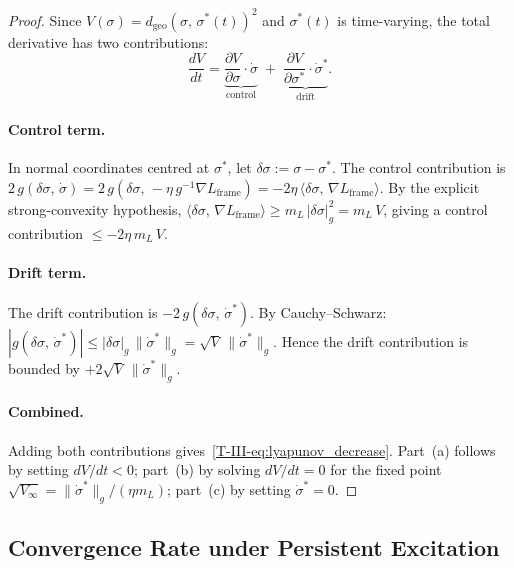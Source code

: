 \documentclass[12pt,a4paper,openany]{book}
\begin{document}
\begin{proof}
Since $V(\sigma) = d_{\mathrm{geo}}(\sigma,\,\sigma^*(t))^2$
and $\sigma^*(t)$ is time-varying, the total derivative
has two contributions:
\begin{equation*}
\frac{dV}{dt}
= \underbrace{\frac{\partial V}{\partial \sigma}
  \cdot \dot{\sigma}}_{\text{control}}
\;+\; \underbrace{\frac{\partial V}{\partial \sigma^*}
  \cdot \dot{\sigma}^*}_{\text{drift}}.
\end{equation*}

\paragraph{Control term.}
In normal coordinates centred at $\sigma^*$, let
$\delta\sigma := \sigma - \sigma^*$.
The control contribution is
$2\,g(\delta\sigma,\,\dot{\sigma})
= 2\,g(\delta\sigma,\,-\eta\,g^{-1}\nabla L_{\mathrm{frame}})
= -2\eta\,\langle \delta\sigma,\,
\nabla L_{\mathrm{frame}}\rangle$.
By the explicit strong-convexity hypothesis,
$\langle \delta\sigma,\,\nabla L_{\mathrm{frame}}\rangle
\geq m_L\,|\delta\sigma|_g^2 = m_L\,V$,
giving a control contribution $\leq -2\eta\,m_L\,V$.

\paragraph{Drift term.}
The drift contribution is
$-2\,g(\delta\sigma,\,\dot{\sigma}^*)$.
By Cauchy--Schwarz:
$|g(\delta\sigma,\,\dot{\sigma}^*)|
\leq |\delta\sigma|_g\,\|\dot{\sigma}^*\|_g
= \sqrt{V}\,\|\dot{\sigma}^*\|_g$.
Hence the drift contribution is bounded by
$+2\sqrt{V}\,\|\dot{\sigma}^*\|_g$.

\paragraph{Combined.}
Adding both contributions
gives~\eqref{T-III-eq:lyapunov_decrease}.
Part~(a) follows by setting
$dV/dt < 0$; part~(b) by solving $dV/dt = 0$ for
the fixed point $\sqrt{V_\infty}
= \|\dot{\sigma}^*\|_g/(\eta m_L)$;
part~(c) by setting $\dot{\sigma}^* = 0$.
\end{proof}

\subsection{Convergence Rate under Persistent Excitation}
\label{T-III-subsec:convergence}
\end{document}
